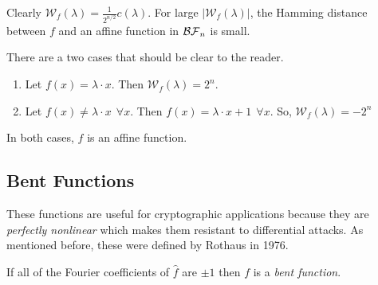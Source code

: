\par Clearly $\mathcal{W}_f(\lambda)=\frac{1}{2^{n/2}}c(\lambda)$. For large
$|\mathcal{W}_f(\lambda)|$, the Hamming distance between $f$ and an affine
function in $\mathcal{BF}_n$ is small.

\begin{example}
  There are a two cases that should be clear to the reader.
  \begin{enumerate}[1.]
    \item Let $f(x)=\lambda\cdot x$. Then $\mathcal{W}_f(\lambda)=2^n$.
    \item Let $f(x)\not=\lambda\cdot x \ \ \forall x$. Then $f(x)=
      \lambda\cdot x+1 \ \ \forall x$. So, $\mathcal{W}_f(\lambda)=-2^n$
  \end{enumerate}
  In both cases, $f$ is an affine function.
\end{example}

\subsection{Bent Functions}
\par These functions are
useful for cryptographic applications because they are \textit{perfectly
nonlinear} which makes them resistant to differential
attacks. As mentioned before, these were defined by Rothaus in 1976.

\begin{definition}\label{def:bent-function}
  If all of the Fourier coefficients of $\hat{f}$ are $\pm1$ then
  $f$ is a \textit{bent function}.
\end{definition}

